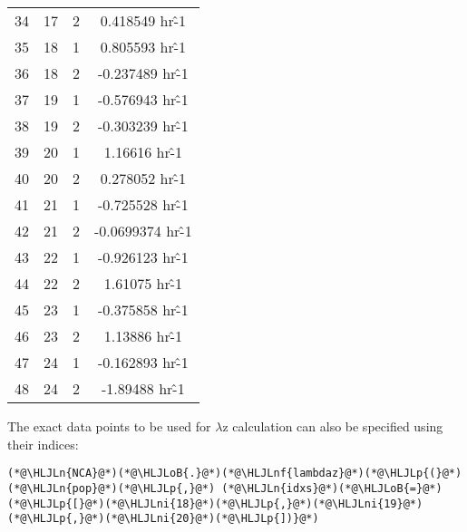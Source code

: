 \documentclass[12pt,a4paper]{article}
\newcommand{\HLJLn}[1]{#1}
\newcommand{\HLJLnf}[1]{\textcolor[RGB]{66,102,213}{#1}}
\newcommand{\HLJLni}[1]{\textcolor[RGB]{59,151,46}{#1}}
\newcommand{\HLJLoB}[1]{\textcolor[RGB]{102,102,102}{\textbf{#1}}}
\newcommand{\HLJLp}[1]{#1}
\begin{document}
\begin{tabular}{r|ccc}
	34 & 17 & 2 & 0.418549 hr\^-1 \\
	35 & 18 & 1 & 0.805593 hr\^-1 \\
	36 & 18 & 2 & -0.237489 hr\^-1 \\
	37 & 19 & 1 & -0.576943 hr\^-1 \\
	38 & 19 & 2 & -0.303239 hr\^-1 \\
	39 & 20 & 1 & 1.16616 hr\^-1 \\
	40 & 20 & 2 & 0.278052 hr\^-1 \\
	41 & 21 & 1 & -0.725528 hr\^-1 \\
	42 & 21 & 2 & -0.0699374 hr\^-1 \\
	43 & 22 & 1 & -0.926123 hr\^-1 \\
	44 & 22 & 2 & 1.61075 hr\^-1 \\
	45 & 23 & 1 & -0.375858 hr\^-1 \\
	46 & 23 & 2 & 1.13886 hr\^-1 \\
	47 & 24 & 1 & -0.162893 hr\^-1 \\
	48 & 24 & 2 & -1.89488 hr\^-1 \\
\end{tabular}


The exact data points to be used for \ensuremath{\lambda}z calculation can also be specified using their indices:


\begin{lstlisting}
(*@\HLJLn{NCA}@*)(*@\HLJLoB{.}@*)(*@\HLJLnf{lambdaz}@*)(*@\HLJLp{(}@*)(*@\HLJLn{pop}@*)(*@\HLJLp{,}@*) (*@\HLJLn{idxs}@*)(*@\HLJLoB{=}@*)(*@\HLJLp{[}@*)(*@\HLJLni{18}@*)(*@\HLJLp{,}@*)(*@\HLJLni{19}@*)(*@\HLJLp{,}@*)(*@\HLJLni{20}@*)(*@\HLJLp{])}@*)
\end{lstlisting}
\end{document}
